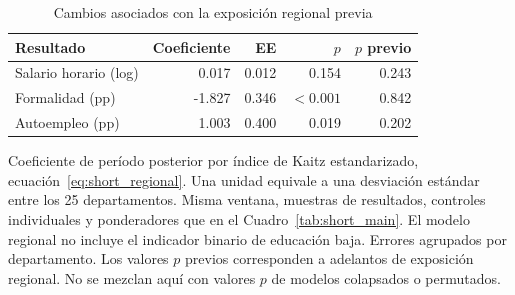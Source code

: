 \begin{table}[!htbp]\centering
\caption{Cambios asociados con la exposición regional previa}\label{tab:short_regional}
\begin{threeparttable}\small
\setlength{\tabcolsep}{4pt}
\begin{tabular}{lrrrr}
\toprule
Resultado & Coeficiente & EE & $p$ & $p$ previo \\
\midrule
Salario horario (log) & 0.017 & 0.012 & 0.154 & 0.243 \\
Formalidad (pp) & -1.827 & 0.346 & $<0.001$ & 0.842 \\
Autoempleo (pp) & 1.003 & 0.400 & 0.019 & 0.202 \\
\bottomrule
\end{tabular}
\begin{tablenotes}\footnotesize
\item Coeficiente de período posterior por índice de Kaitz estandarizado, ecuación~\eqref{eq:short_regional}. Una unidad equivale a una desviación estándar entre los 25 departamentos. Misma ventana, muestras de resultados, controles individuales y ponderadores que en el Cuadro~\ref{tab:short_main}. El modelo regional no incluye el indicador binario de educación baja. Errores agrupados por departamento. Los valores $p$ previos corresponden a adelantos de exposición regional. No se mezclan aquí con valores $p$ de modelos colapsados o permutados.
\end{tablenotes}
\end{threeparttable}\end{table}
